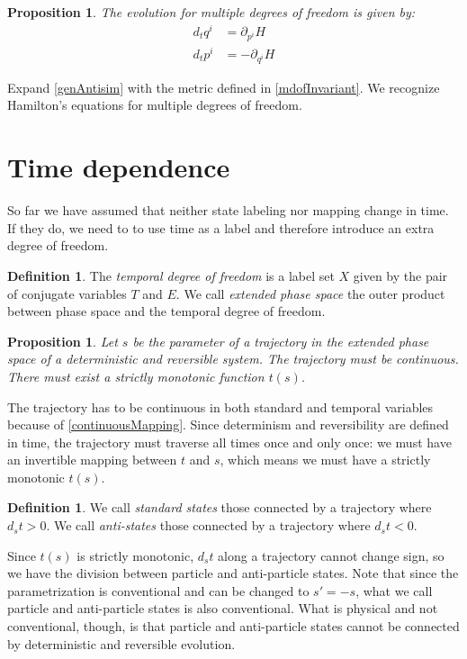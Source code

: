 \documentclass[twocolumn,floatfix,nofootinbib]{revtex4}   %
\theoremstyle{theorem}
\newtheorem{prop}[thm]{Proposition}
\theoremstyle{definition}
\newtheorem{defn}[thm]{Definition}
\begin{document}
\begin{prop}\label{mdofHam}
The evolution for multiple degrees of freedom is given by:
\begin{align*}
d_{t}q^i &= \partial_{p^i} H \\
d_{t}p^i &= - \partial_{q^i} H
\end{align*}
\end{prop}

Expand \ref{genAntisim} with the metric defined in \ref{mdofInvariant}. We recognize Hamilton's equations for multiple degrees of freedom\cite{classical_dynamics}.

\section{Time dependence}
So far we have assumed that neither state labeling nor mapping change in time. If they do, we need to to use time as a label and therefore introduce an extra degree of freedom.

\begin{defn}\label{tdof}
The \emph{temporal degree of freedom} is a label set $X$ given by the pair of conjugate variables $T$ and $E$. We call \emph{extended phase space} the outer product between phase space and the temporal degree of freedom.
\end{defn}

\begin{prop}\label{tdofMonotonic}
Let $s$ be the parameter of a trajectory in the extended phase space of a deterministic and reversible system. The trajectory must be continuous. There must exist a strictly monotonic function $t(s)$.
\end{prop}

The trajectory has to be continuous in both standard and temporal variables because of \ref{continuousMapping}. Since determinism and reversibility are defined in time, the trajectory must traverse all times once and only once: we must have an invertible mapping between $t$ and $s$, which means we must have a strictly monotonic $t(s)$.

\begin{defn}\label{tdofAntistates}
We call \emph{standard states} those connected by a trajectory where $d_{s}t>0$. We call \emph{anti-states} those connected by a trajectory where $d_{s}t<0$.
\end{defn}

Since $t(s)$ is strictly monotonic, $d_{s}t$ along a trajectory cannot change sign, so we have the division between particle and anti-particle states. Note that since the parametrization is conventional and can be changed to $s'=-s$, what we call particle and anti-particle states is also conventional. What is physical and not conventional, though, is that particle and anti-particle states cannot be connected by deterministic and reversible evolution.
\end{document}
